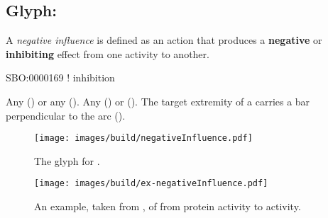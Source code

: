 \subsection{Glyph: }
\label{sec:af:negative_infl}

A \emph{negative influence} is defined as an action that produces a \textbf{negative} or \textbf{inhibiting} effect from one activity to another.

\begin{glyphDescription}

\glyphSboTerm SBO:0000169 ! inhibition

 \glyphOrigin Any  () or any  ().
 \glyphTarget Any  () or  ().
 \glyphEndPoint The target extremity of a  carries a bar perpendicular to the arc ().

\end{glyphDescription}

\begin{figure}[H]
  \centering
  \texttt{[image: images/build/negativeInfluence.pdf]}
  \caption{The \AF glyph for .}
  \label{fig:af:negativeInfl}
\end{figure}

\begin{figure}[H]
  \centering
  \texttt{[image: images/build/ex-negativeInfluence.pdf]}
  \caption{An example, taken from , of  from  protein activity to  activity.}
  \label{fig:af:ex-NI}
\end{figure} 